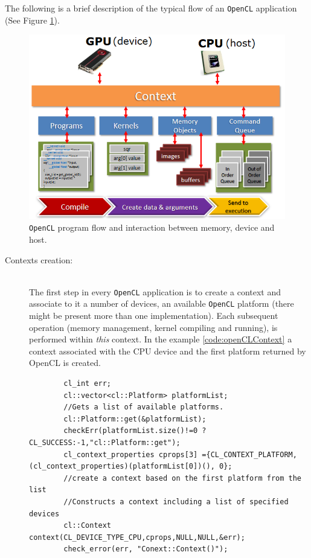 \begin{description}
    The following is a brief description of the typical flow of an \texttt{OpenCL} application (See Figure \ref{fig:opencl_execmodel}).
    \begin{figure}
    	\centering
    	\includegraphics[width=1.0\textwidth]{./images/parallel_programming/opencl_program_flow}
    	\caption{\texttt{OpenCL} program flow and interaction between memory, device and host.}\label{fig:opencl_execmodel}
    \end{figure}

    \begin{description}
    	\item [Contexts creation:]\hfil \\ The first step in every \texttt{OpenCL} application is to create a context and associate to it a number of devices, an available \texttt{OpenCL} platform (there might be present more than one implementation). Each subsequent operation (memory management, kernel compiling and running), is performed within \emph{this} context. In the example \ref{code:openCLContext} a context associated with the CPU device and the first platform returned by OpenCL is created.
    	\begin{lstlisting}
    	cl_int err;
    	cl::vector<cl::Platform> platformList;
    	//Gets a list of available platforms.
    	cl::Platform::get(&platformList); 
   		checkErr(platformList.size()!=0 ?CL_SUCCESS:-1,"cl::Platform::get");
    	cl_context_properties cprops[3] ={CL_CONTEXT_PLATFORM,(cl_context_properties)(platformList[0])(), 0};
    	//create a context based on the first platform from the list
    	//Constructs a context including a list of specified devices
    	cl::Context context(CL_DEVICE_TYPE_CPU,cprops,NULL,NULL,&err);
    	check_error(err, "Conext::Context()"); 
    	\end{lstlisting}


\end{description}
\end{description}
